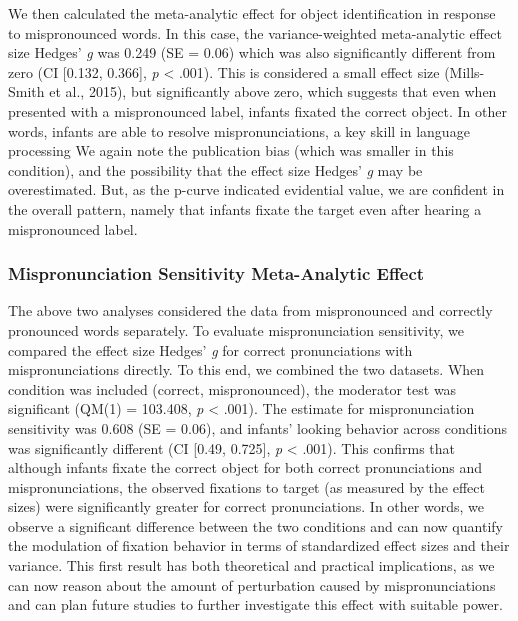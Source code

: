 \documentclass[man]{apa6}
\begin{document}
We then calculated the meta-analytic effect for object identification in response to mispronounced words. In this case, the variance-weighted meta-analytic effect size Hedges' \emph{g} was 0.249 (SE = 0.06) which was also significantly different from zero (CI {[}0.132, 0.366{]}, \emph{p} \textless{} .001). This is considered a small effect size (Mills-Smith et al., 2015), but significantly above zero, which suggests that even when presented with a mispronounced label, infants fixated the correct object. In other words, infants are able to resolve mispronunciations, a key skill in language processing We again note the publication bias (which was smaller in this condition), and the possibility that the effect size Hedges' \emph{g} may be overestimated. But, as the p-curve indicated evidential value, we are confident in the overall pattern, namely that infants fixate the target even after hearing a mispronounced label.

\hypertarget{mispronunciation-sensitivity-meta-analytic-effect}{%
\subsubsection{Mispronunciation Sensitivity Meta-Analytic Effect}\label{mispronunciation-sensitivity-meta-analytic-effect}}

The above two analyses considered the data from mispronounced and correctly pronounced words separately. To evaluate mispronunciation sensitivity, we compared the effect size Hedges' \emph{g} for correct pronunciations with mispronunciations directly. To this end, we combined the two datasets. When condition was included (correct, mispronounced), the moderator test was significant (QM(1) = 103.408, \emph{p} \textless{} .001). The estimate for mispronunciation sensitivity was 0.608 (SE = 0.06), and infants' looking behavior across conditions was significantly different (CI {[}0.49, 0.725{]}, \emph{p} \textless{} .001). This confirms that although infants fixate the correct object for both correct pronunciations and mispronunciations, the observed fixations to target (as measured by the effect sizes) were significantly greater for correct pronunciations. In other words, we observe a significant difference between the two conditions and can now quantify the modulation of fixation behavior in terms of standardized effect sizes and their variance. This first result has both theoretical and practical implications, as we can now reason about the amount of perturbation caused by mispronunciations and can plan future studies to further investigate this effect with suitable power.
\end{document}
